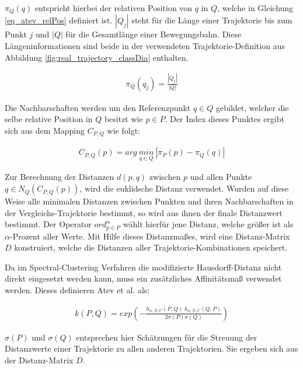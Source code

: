 $\pi_Q(q)$ entspricht hierbei der relativen Position von $q$ in $Q$, welche in Gleichung \ref{eq_atev_relPos} definiert ist.
$|Q_j|$ steht für die Länge einer Trajektorie bis zum Punkt $j$ und $|Q|$ für die Gesamtlänge einer Bewegungsbahn.
Diese Längeninformationen sind beide in der verwendeten Trajektorie-Definition aus Abbildung
\ref{fig:real_trajectory_classDia} enthalten.

\begin{ceqn}
\begin{align}
\label{eq_atev_relPos}
    \pi_Q(q_j) = \frac{|Q_j|}{|Q|}
\end{align}
\end{ceqn}

Die Nachbarschaften werden um den Referenzpunkt $q \in Q$ gebildet, welcher die selbe relative Position
in $Q$ besitzt wie $p \in P$. Der Index dieses Punktes ergibt sich aus dem Mapping $C_{P,Q}$ wie folgt:

\begin{ceqn}
\begin{align}
    C_{P,Q}(p) = arg\ \underset{q \in Q}{min}\ |\pi_P(p) - \pi_Q(q)|
\end{align}
\end{ceqn}

Zur Berechnung der Distanzen $d(p,q)$ zwischen $p$ und allen Punkte $q \in N_Q(C_{P,Q}(p))$, wird die euklidsche
Distanz verwendet. Wurden auf diese Weise alle minimalen Distanzen zwischen Punkten und ihren Nachbarschaften in
der Vergleichs-Trajektorie bestimmt, so wird aus ihnen der finale Distanzwert bestimmt. Der Operator
$ord_{p \in P}^{\alpha}$ wählt hierfür jene Distanz, welche größer ist als $\alpha$-Prozent aller Werte.
Mit Hilfe dieses Distanzmaßes, wird eine Distanz-Matrix $D$ konstruiert, welche die Distanzen
aller Trajektorie-Kombinationen speichert.

Da im Spectral-Clustering Verfahren die modifizierte Hausdorff-Distanz nicht direkt eingesetzt werden kann,
muss ein zusätzliches Affinitätsmaß verwendet werden. %
Dieses definieren Atev et al. als:

\begin{ceqn}
\begin{align}
    k(P,Q) = exp (- \frac{h_{\alpha, N, C}(P,Q)\ h_{\alpha, N, C}(Q,P)}{2 \sigma(P) \sigma(Q)})
\end{align}
\end{ceqn}

$\sigma(P)$ und $\sigma(Q)$ entsprechen hier Schätzungen für die Streuung der Distanzwerte einer Trajektorie
zu allen anderen Trajektorien. Sie ergeben sich aus der Distanz-Matrix $D$.


